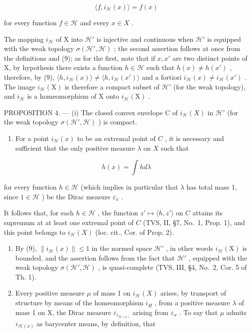 \[
\langle f, i _ {\mathcal {H}} (x) \rangle = f (x)\tag{9}
\]

for every function \(f \in \mathcal{H}\) and every \(x \in X\) .

The mapping \(i_{\mathcal{H}}\) of X into \(\mathcal{H}'\) is injective and continuous when \(\mathcal{H}'\) is equipped with the weak topology \(\sigma(\mathcal{H}', \mathcal{H})\) ; the second assertion follows at once from the definitions and (9); as for the first, note that if \(x, x'\) are two distinct points of X, by hypothesis there exists a function \(h \in \mathcal{H}\) such that \(h(x) \neq h(x')\) , therefore, by (9), \(\langle h, i_{\mathcal{H}}(x) \rangle \neq \langle h, i_{\mathcal{H}}(x') \rangle\) and a fortiori \(i_{\mathcal{H}}(x) \neq i_{\mathcal{H}}(x')\) . The image \(i_{\mathcal{H}}(\mathrm{X})\) is therefore a compact subset of \(\mathcal{H}'\) (for the weak topology), and \(i_{\mathcal{H}}\) is a homeomorphism of X onto \(i_{\mathcal{H}}(\mathrm{X})\) .

PROPOSITION 4. --- (i) The closed convex envelope C of \(i_{\mathcal{H}}(X)\) in \(\mathcal{H}'\) (for the weak topology \(\sigma(\mathcal{H}', \mathcal{H})\) ) is compact.

\begin{enumerate}
\def\labelenumi{(\roman{enumi})}
\setcounter{enumi}{1}
\tightlist
\item
  For a point \(i_{\mathcal{H}}(x)\) to be an extremal point of \(C\) , it is necessary and sufficient that the only positive measure \(\lambda\) on \(X\) such that
\end{enumerate}

\[
h (x) = \int h d \lambda\tag{10}
\]

for every function \(h \in \mathcal{H}\) (which implies in particular that \(\lambda\) has total mass 1, since \(1 \in \mathcal{H}\) ) be the Dirac measure \(\varepsilon_x\) .

It follows that, for each \(h \in \mathcal{H}\) , the function \(z' \mapsto \langle h, z' \rangle\) on \(C\) attains its supremum at at least one extremal point of \(C\) (TVS, II, §7, No.~1, Prop. 1), and this point belongs to \(i_{\mathcal{H}}(X)\) (loc. cit., Cor. of Prop. 2).

\begin{enumerate}
\def\labelenumi{(\roman{enumi})}
\item
  By (9), \(\| i_{\mathcal{H}}(x)\| \leqslant 1\) in the normed space \(\mathcal{H}'\) , in other words \(i_{\mathcal{H}}(\mathrm{X})\) is bounded, and the assertion follows from the fact that \(\mathcal{H}'\) , equipped with the weak topology \(\sigma (\mathcal{H}',\mathcal{H})\) , is quasi-complete (TVS, III, §4, No.~2, Cor. 5 of Th. 1).
\item
  Every positive measure \(\mu\) of mass 1 on \(i_{\mathcal{H}}(X)\) arises, by transport of structure by means of the homeomorphism \(i_{H}\) , from a positive measure \(\lambda\) of mass 1 on X, the Dirac measure \(\varepsilon_{i_{\mathcal{H}(x)}}\) arising from \(\varepsilon_{x}\) . To say that \(\mu\) admits \(i_{\mathcal{H}(x)}\) as barycenter means, by definition, that
\end{enumerate}

